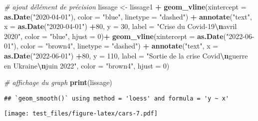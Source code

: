 \documentclass[
]{article}
\newenvironment{Shaded}{\begin{snugshade}}{\end{snugshade}}
\newcommand{\AttributeTok}[1]{\textcolor[rgb]{0.13,0.29,0.53}{#1}}
\newcommand{\CommentTok}[1]{\textcolor[rgb]{0.56,0.35,0.01}{\textit{#1}}}
\newcommand{\DecValTok}[1]{\textcolor[rgb]{0.00,0.00,0.81}{#1}}
\newcommand{\FunctionTok}[1]{\textcolor[rgb]{0.13,0.29,0.53}{\textbf{#1}}}
\newcommand{\NormalTok}[1]{#1}
\newcommand{\OtherTok}[1]{\textcolor[rgb]{0.56,0.35,0.01}{#1}}
\newcommand{\SpecialCharTok}[1]{\textcolor[rgb]{0.81,0.36,0.00}{\textbf{#1}}}
\newcommand{\StringTok}[1]{\textcolor[rgb]{0.31,0.60,0.02}{#1}}
\begin{document}
\begin{Shaded}
\begin{Highlighting}[]
\CommentTok{\# ajout d\textquotesingle{}élément de précision }
\NormalTok{lissage }\OtherTok{\textless{}{-}}\NormalTok{ lissage1 }\SpecialCharTok{+} 
  \FunctionTok{geom\_vline}\NormalTok{(}\AttributeTok{xintercept =} \FunctionTok{as.Date}\NormalTok{(}\StringTok{"2020{-}04{-}01"}\NormalTok{),}
             \AttributeTok{color =} \StringTok{"blue"}\NormalTok{, }
             \AttributeTok{linetype =} \StringTok{"dashed"}\NormalTok{) }\SpecialCharTok{+} 
  \FunctionTok{annotate}\NormalTok{(}\StringTok{"text"}\NormalTok{, }
           \AttributeTok{x =} \FunctionTok{as.Date}\NormalTok{(}\StringTok{"2020{-}04{-}01"}\NormalTok{) }\SpecialCharTok{+}\DecValTok{80}\NormalTok{, }
           \AttributeTok{y =} \DecValTok{30}\NormalTok{, }\AttributeTok{label =} \StringTok{"Crise du Covid{-}19}\SpecialCharTok{\textbackslash{}n}\StringTok{avril 2020"}\NormalTok{, }
           \AttributeTok{color =} \StringTok{"blue"}\NormalTok{, }
           \AttributeTok{hjust =} \DecValTok{0}\NormalTok{)}\SpecialCharTok{+}
  \FunctionTok{geom\_vline}\NormalTok{(}\AttributeTok{xintercept =} \FunctionTok{as.Date}\NormalTok{(}\StringTok{"2022{-}06{-}01"}\NormalTok{),}
             \AttributeTok{color =} \StringTok{"brown4"}\NormalTok{, }
             \AttributeTok{linetype =} \StringTok{"dashed"}\NormalTok{) }\SpecialCharTok{+} 
  \FunctionTok{annotate}\NormalTok{(}\StringTok{"text"}\NormalTok{, }
           \AttributeTok{x =} \FunctionTok{as.Date}\NormalTok{(}\StringTok{"2022{-}06{-}01"}\NormalTok{) }\SpecialCharTok{+}\DecValTok{80}\NormalTok{, }
           \AttributeTok{y =} \DecValTok{110}\NormalTok{, }\AttributeTok{label =} \StringTok{"Sortie de la crise Covid}\SpecialCharTok{\textbackslash{}n}\StringTok{guerre en Ukraine}\SpecialCharTok{\textbackslash{}n}\StringTok{juin 2022"}\NormalTok{, }
           \AttributeTok{color =} \StringTok{"brown4"}\NormalTok{, }
           \AttributeTok{hjust =} \DecValTok{0}\NormalTok{)}

\CommentTok{\# affichage du graph}
\FunctionTok{print}\NormalTok{(lissage)}
\end{Highlighting}
\end{Shaded}

\begin{verbatim}
## `geom_smooth()` using method = 'loess' and formula = 'y ~ x'
\end{verbatim}

\texttt{[image: test\_files/figure-latex/cars-7.pdf]}
\end{document}
